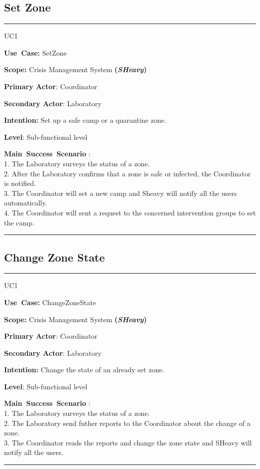 \subsection{Set Zone}
\vspace{0.5cm}
\hrule
\vspace{0.5cm}
\begin{lyxlist}{UC1}
\small{
\item [\textbf{Use~Case:}] SetZone
\item [\textbf{Scope:}] Crisis Management System \textbf{(\emph{SHeavy})}
\item [\textbf{Primary Actor}:] Coordinator
\item [\textbf{Secondary Actor}:] Laboratory
\item [\textbf{Intention:}] Set up a safe camp or a quarantine zone.
\item [\textbf{Level}:]Sub-functional level
\item [\textbf{Main~Success~Scenario}]:\\
1. The Laboratory surveys the status of a zone.\\
2. After the Laboratory confirms that a zone is safe or infected, the
Coordinator is notified.\\
3. The Coordinator will set a new camp and Sheavy will notify all the users
automatically.\\ 
4.	The Coordinator will sent a request to the concerned intervention groups to
set the camp.\\
}
\end{lyxlist}
\hrule
\vspace{0.5cm} 

\subsection{Change Zone State}
\vspace{0.5cm}
\hrule
\vspace{0.5cm}
\begin{lyxlist}{UC1}
\small{
\item [\textbf{Use~Case:}] ChangeZoneState
\item [\textbf{Scope:}] Crisis Management System \textbf{(\emph{SHeavy})}
\item [\textbf{Primary Actor}:] Coordinator
\item [\textbf{Secondary Actor}:] Laboratory
\item [\textbf{Intention:}] Change the state of an already set zone.
\item [\textbf{Level}:]Sub-functional level
\item [\textbf{Main~Success~Scenario}]:\\
1. The Laboratory surveys the status of a zone.\\
2. The Laboratory send futher reports to the Coordinator about the change of a
zone.\\
3. The Coordinator reads the reports and change the zone state and SHeavy will
notify all the users.\\
}
\end{lyxlist}
\hrule
\vspace{0.5cm} 

